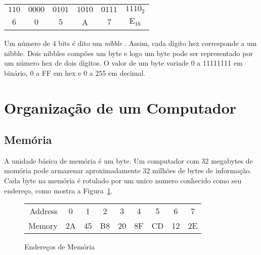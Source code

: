 \begin{tabular}{cccccc}
$110$ & $0000$ & $0101$ & $1010$ & $0111$ & $1110_2$ \\
  $6$ & $0$    &   $5$  &   A  &  $7$   &    $\mathrm{E}_{16}$ \\
\end{tabular}\newline

Um número de 4 bits é dito um \emph{nibble} . Assim, cada dígito 
hex corresponde a um nibble. Dois nibbles compões um byte e logo um byte pode 
ser representado por um número hex de dois dígitos. O valor de um byte variade 
0 a 11111111 em binário, 0 a FF em hex e 0 a 255 em decimal.


\section{Organização de um Computador}

\subsection{Memória}

A unidade básica de memória é um byte.  
Um computador com 32 megabytes de momória pode armazenar aproximadamente 32 
milhões de bytes de informação. Cada byte na memória é rotulado por um 
unico numero conhecido como seu endereço, como mostra a 
Figura~\ref{fig:memory}.

\begin{figure}[ht]
\begin{center}
\begin{tabular}{rcccccccc}
Address & 0 & 1 & 2 & 3 & 4 & 5 & 6 & 7 \\
\cline{2-9}
Memory & \multicolumn{1}{|c}{2A}  & \multicolumn{1}{|c}{45}  
       & \multicolumn{1}{|c}{B8} & \multicolumn{1}{|c}{20} 
       & \multicolumn{1}{|c}{8F} & \multicolumn{1}{|c}{CD} 
       & \multicolumn{1}{|c}{12} & \multicolumn{1}{|c|}{2E} \\
\cline{2-9}
\end{tabular}
\caption{ Endereços de Memória \label{fig:memory} }
\end{center}
\end{figure}

